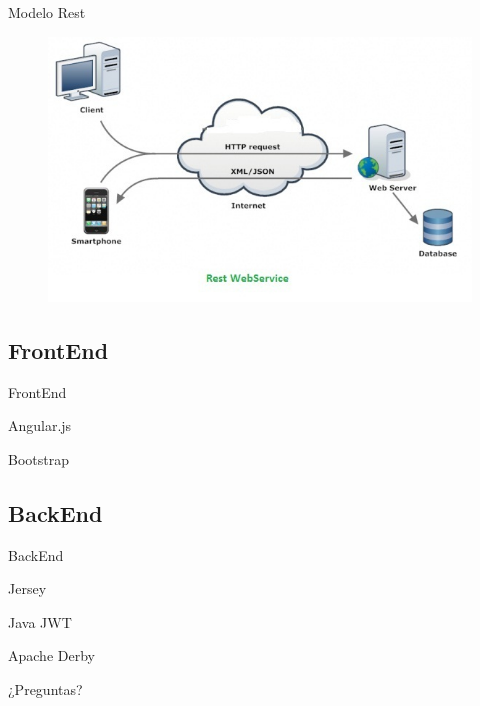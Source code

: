 \documentclass{beamer}
\begin{document}
            \begin{frame}{Modelo Rest}
                \begin{figure}
                    \centering
                    \includegraphics[width=\textwidth]{res/rest-webservices}
                \end{figure}
            \end{frame}

        \subsection{FrontEnd}

            \begin{frame}{FrontEnd}

            \end{frame}

            \begin{frame}{Angular.js}

            \end{frame}

            \begin{frame}{Bootstrap}

            \end{frame}

        \subsection{BackEnd}

            \begin{frame}{BackEnd}

            \end{frame}

            \begin{frame}{Jersey}

            \end{frame}

            \begin{frame}{Java JWT}

            \end{frame}

            \begin{frame}{Apache Derby}

            \end{frame}
    \begin{frame}[standout]
        ¿Preguntas?
    \end{frame}
\end{document}
